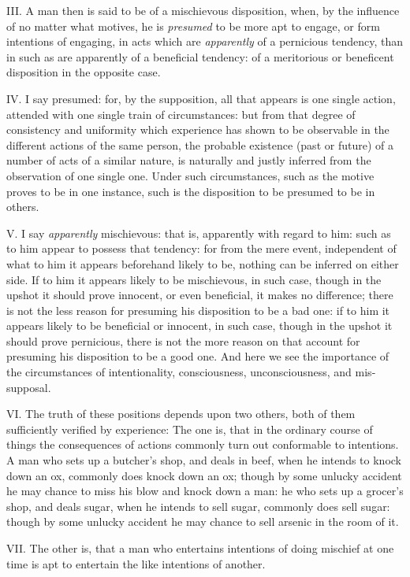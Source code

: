 \documentclass[12pt]{report}
\begin{document}
III. A man then is said to be of a mischievous disposition, when, by the
influence of no matter what motives, he is \emph{presumed} to be more
apt to engage, or form intentions of engaging, in acts which are
\emph{apparently} of a pernicious tendency, than in such as are
apparently of a beneficial tendency: of a meritorious or beneficent
disposition in the opposite case.

IV. I say presumed: for, by the supposition, all that appears is one
single action, attended with one single train of circumstances: but from
that degree of consistency and uniformity which experience has shown to
be observable in the different actions of the same person, the probable
existence (past or future) of a number of acts of a similar nature, is
naturally and justly inferred from the observation of one single one.
Under such circumstances, such as the motive proves to be in one
instance, such is the disposition to be presumed to be in others.

V. I say \emph{apparently} mischievous: that is, apparently with regard
to him: such as to him appear to possess that tendency: for from the
mere event, independent of what to him it appears beforehand likely to
be, nothing can be inferred on either side. If to him it appears likely
to be mischievous, in such case, though in the upshot it should prove
innocent, or even beneficial, it makes no difference; there is not the
less reason for presuming his disposition to be a bad one: if to him it
appears likely to be beneficial or innocent, in such case, though in the
upshot it should prove pernicious, there is not the more reason on that
account for presuming his disposition to be a good one. And here we see
the importance of the circumstances of intentionality, consciousness,
unconsciousness, and mis-supposal.

VI. The truth of these positions depends upon two others, both of them
sufficiently verified by experience: The one is, that in the ordinary
course of things the consequences of actions commonly turn out
conformable to intentions. A man who sets up a butcher's shop, and deals
in beef, when he intends to knock down an ox, commonly does knock down
an ox; though by some unlucky accident he may chance to miss his blow
and knock down a man: he who sets up a grocer's shop, and deals sugar,
when he intends to sell sugar, commonly does sell sugar: though by some
unlucky accident he may chance to sell arsenic in the room of it.

VII. The other is, that a man who entertains intentions of doing
mischief at one time is apt to entertain the like intentions of another.
\end{document}

